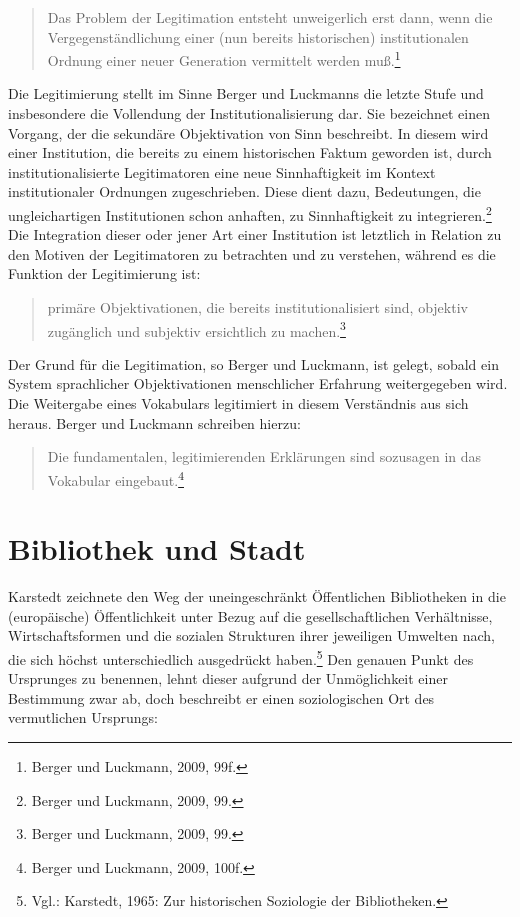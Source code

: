 \documentclass[a4paper,
fontsize=11pt,
oneside,
numbers=noperiodatend,
parskip=half-,
bibliography=totoc,
final
]{scrartcl}
\begin{document}
\begin{quote}
Das Problem der Legitimation entsteht unweigerlich erst dann, wenn die
Vergegenständlichung einer (nun bereits historischen) institutionalen
Ordnung einer neuer Generation vermittelt werden muß.\footnote{Berger
  und Luckmann, 2009, 99f.}
\end{quote}

Die Legitimierung stellt im Sinne Berger und Luckmanns die letzte Stufe
und insbesondere die Vollendung der Institutionalisierung dar. Sie
bezeichnet einen Vorgang, der die sekundäre Objektivation von Sinn
beschreibt. In diesem wird einer Institution, die bereits zu einem
historischen Faktum geworden ist, durch institutionalisierte
Legitimatoren eine neue Sinnhaftigkeit im Kontext institutionaler
Ordnungen zugeschrieben. Diese dient dazu, Bedeutungen, die
ungleichartigen Institutionen schon anhaften, zu Sinnhaftigkeit zu
integrieren.\footnote{Berger und Luckmann, 2009, 99.} Die Integration
dieser oder jener Art einer Institution ist letztlich in Relation zu den
Motiven der Legitimatoren zu betrachten und zu verstehen, während es die
Funktion der Legitimierung ist:

\begin{quote}
primäre Objektivationen, die bereits institutionalisiert sind, objektiv
zugänglich und subjektiv ersichtlich zu machen.\footnote{Berger und
  Luckmann, 2009, 99.}
\end{quote}

Der Grund für die Legitimation, so Berger und Luckmann, ist gelegt,
sobald ein System sprachlicher Objektivationen menschlicher Erfahrung
weitergegeben wird. Die Weitergabe eines Vokabulars legitimiert in
diesem Verständnis aus sich heraus. Berger und Luckmann schreiben
hierzu:

\begin{quote}
Die fundamentalen, legitimierenden Erklärungen sind sozusagen in das
Vokabular eingebaut.\footnote{Berger und Luckmann, 2009, 100f.}
\end{quote}

\section*{Bibliothek und Stadt}\label{bibliothek-und-stadt}

Karstedt zeichnete den Weg der uneingeschränkt Öffentlichen Bibliotheken
in die (europäische) Öffentlichkeit unter Bezug auf die
gesellschaftlichen Verhältnisse, Wirtschaftsformen und die sozialen
Strukturen ihrer jeweiligen Umwelten nach, die sich höchst
unterschiedlich ausgedrückt haben.\footnote{Vgl.: Karstedt, 1965: Zur
  historischen Soziologie der Bibliotheken.} Den genauen Punkt des
Ursprunges zu benennen, lehnt dieser aufgrund der Unmöglichkeit einer
Bestimmung zwar ab, doch beschreibt er einen soziologischen Ort des
vermutlichen Ursprungs:
\end{document}
